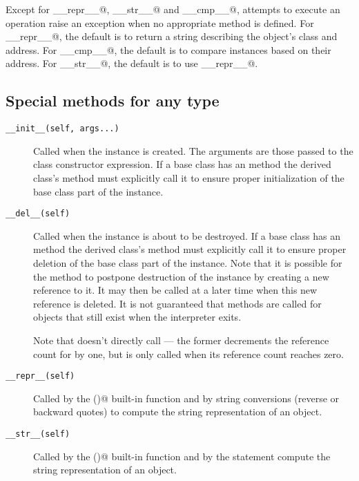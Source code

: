 Except for \verb@__repr__@, \verb@__str__@ and \verb@__cmp__@,
attempts to execute an
operation raise an exception when no appropriate method is defined.
For \verb@__repr__@, the default is to return a string describing the
object's class and address.
For \verb@__cmp__@, the default is to compare instances based on their
address.
For \verb@__str__@, the default is to use \verb@__repr__@.


\subsection{Special methods for any type}

\begin{description}

\item[\tt __init__(self, args...)]
Called when the instance is created.  The arguments are those passed
to the class constructor expression.  If a base class has an
 method the derived class's  method must
explicitly call it to ensure proper initialization of the base class
part of the instance.

\item[\tt __del__(self)]
Called when the instance is about to be destroyed.  If a base class
has an  method the derived class's  method
must explicitly call it to ensure proper deletion of the base class
part of the instance.  Note that it is possible for the 
method to postpone destruction of the instance by creating a new
reference to it.  It may then be called at a later time when this new
reference is deleted.  It is not guaranteed that
 methods are called for objects that still exist when
the interpreter exits.

Note that  doesn't directly call  --- the
former decrements the reference count for  by one, but
 is only called when its reference count reaches zero.

\item[\tt __repr__(self)]
Called by the \verb@repr()@ built-in function and by string conversions
(reverse or backward quotes) to compute the string representation of an object.

\item[\tt __str__(self)]
Called by the \verb@str()@ built-in function and by the \verb@print@
statement compute the string representation of an object.


\end{description}
